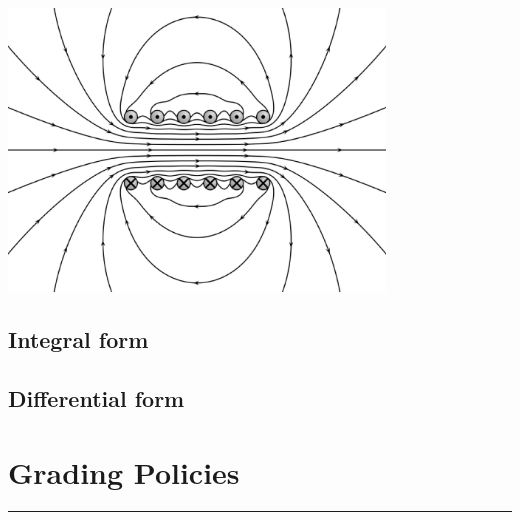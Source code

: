 \documentclass[letterpaper,10pt,fleqn]{article}
\numberwithin{equation}{section}
\begin{document}
\centerline{\includegraphics[width=0.75\textwidth]{maxwell.eps}}

\subsection*{Integral form}

\subsection*{Differential form}

\newpage

\section*{Grading Policies}
\hrule
\end{document}
